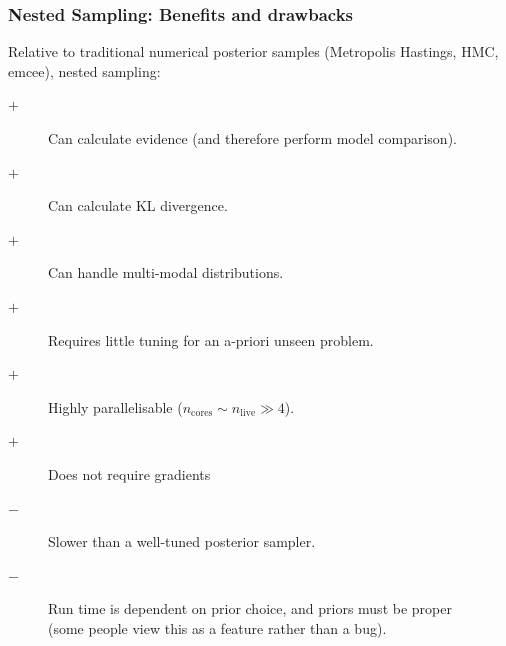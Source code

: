 \documentclass[aspectratio=169]{beamer}
\begin{document}
\begin{frame}
    \frametitle{Nested Sampling: Benefits and drawbacks}
    Relative to traditional numerical posterior samples (Metropolis Hastings, HMC, emcee), nested sampling:
    \begin{description}
        \item[$+$] Can calculate evidence (and therefore perform model comparison).
        \item[$+$] Can calculate KL divergence.
        \item[$+$] Can handle multi-modal distributions.
        \item[$+$] Requires little tuning for an a-priori unseen problem.
        \item[$+$] Highly parallelisable ($n_\mathrm{cores} \sim n_\mathrm{live} \gg 4$).
        \item[$+$] Does not require gradients
        \item[$-$] Slower than a well-tuned posterior sampler.
        \item[$-$] Run time is dependent on prior choice, and priors must be proper \\(some people view this as a feature rather than a bug).
    \end{description}
\end{frame}
\end{document}
